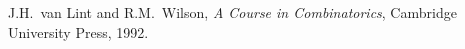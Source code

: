 \documentclass[a4paper]{article}
\begin{document}
\begin{thebibliography}{9}



 J.H.~van Lint and R.M.~Wilson,
{\sl A Course in Combinatorics}, Cambridge University Press, 1992.



\end{thebibliography}
\end{document}
